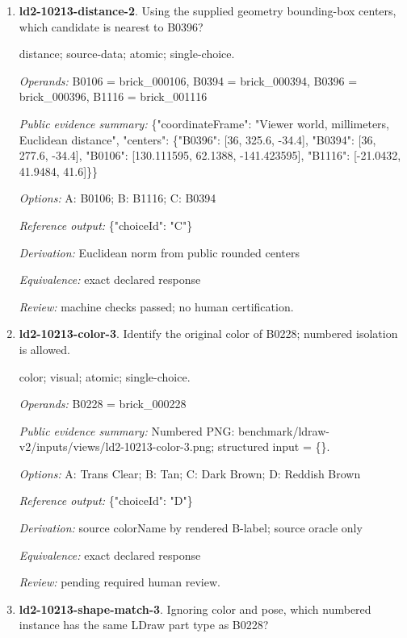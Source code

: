 \begin{enumerate}
\item \textbf{ld2-10213-distance-2}. Using the supplied geometry bounding-box centers, which candidate is nearest to B0396?
\par{\small distance; source-data; atomic; single-choice.\par\textit{Operands:} B0106 = brick\_000106, B0394 = brick\_000394, B0396 = brick\_000396, B1116 = brick\_001116\par\textit{Public evidence summary:} \{"coordinateFrame": "Viewer world, millimeters, Euclidean distance", "centers": \{"B0396": [36, 325.6, -34.4], "B0394": [36, 277.6, -34.4], "B0106": [130.111595, 62.1388, -141.423595], "B1116": [-21.0432, 41.9484, 41.6]\}\}\par\textit{Options:} A: B0106; B: B1116; C: B0394\par\textit{Reference output:} \{"choiceId": "C"\}\par\textit{Derivation:} Euclidean norm from public rounded centers\par\textit{Equivalence:} exact declared response\par\textit{Review:} machine checks passed; no human certification.}
\item \textbf{ld2-10213-color-3}. Identify the original color of B0228; numbered isolation is allowed.
\par{\small color; visual; atomic; single-choice.\par\textit{Operands:} B0228 = brick\_000228\par\textit{Public evidence summary:} Numbered PNG: benchmark/ldraw-v2/inputs/views/ld2-10213-color-3.png; structured input = \{\}.\par\textit{Options:} A: Trans Clear; B: Tan; C: Dark Brown; D: Reddish Brown\par\textit{Reference output:} \{"choiceId": "D"\}\par\textit{Derivation:} source colorName by rendered B-label; source oracle only\par\textit{Equivalence:} exact declared response\par\textit{Review:} pending required human review.}
\item \textbf{ld2-10213-shape-match-3}. Ignoring color and pose, which numbered instance has the same LDraw part type as B0228?

\end{enumerate}
